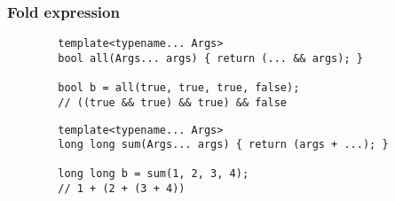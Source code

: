 \documentclass[C++.tex]{subfiles}
\begin{document}
\begin{frame}[fragile]
	\frametitle{Fold expression}
	\begin{verbatim}
		template<typename... Args>
		bool all(Args... args) { return (... && args); }

		bool b = all(true, true, true, false);
		// ((true && true) && true) && false
	\end{verbatim}

	\begin{verbatim}
		template<typename... Args>
		long long sum(Args... args) { return (args + ...); }

		long long b = sum(1, 2, 3, 4);
		// 1 + (2 + (3 + 4))
	\end{verbatim}




\end{frame}
\end{document}
